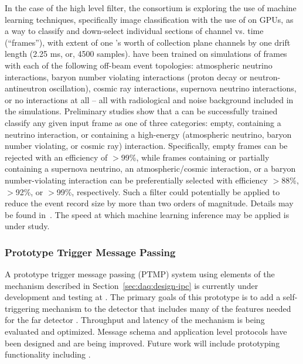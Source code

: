 In the case of the high level filter, the consortium is exploring the
use of machine learning techniques, specifically image classification
with the use of  on GPUs, as a way to
classify and down-select individual sections of  channel vs. time
(``frames''), with extent of one 's worth of collection plane
channels by one drift length (2.25 ms, or, 4500 samples).  have
been trained on  simulations of frames with each of
the following off-beam event topologies: 
atmospheric neutrino interactions, baryon number violating
interactions (proton decay or neutron-antineutron oscillation), cosmic
ray interactions, supernova neutrino interactions, or no interactions at all -- all
with radiological and noise background included in the
simulations. Preliminary studies show that a  can be successfully trained classify any
given input frame as one of three categories: empty, containing a  neutrino
interaction, or containing a high-energy (atmospheric neutrino, baryon
number violating, or cosmic ray) interaction. Specifically, empty frames can be
rejected with an efficiency of $>$99\%, while frames containing or
partially containing 
a supernova neutrino, an atmospheric/cosmic interaction, or a baryon
number-violating interaction can be preferentially selected with efficiency
$>$88\%, $>$92\%, or $>$99\%, respectively. Such a 
filter could potentially be applied to reduce the event record size by
more than two orders of magnitude. Details may be found in~.
The speed at which machine learning inference may be applied is under study.


\subsubsection{Prototype Trigger Message Passing}

A prototype trigger message passing (PTMP) system using elements of the  mechanism described in Section~\ref{sec:daq:design-ipc} is currently under development and testing at .
The primary goals of this prototype is to add a self-triggering mechanism to the  detector that includes many of the features needed for the far detector .
Throughput and latency of the mechanism is being evaluated and optimized.
Message schema and application level protocols have been designed and are being improved.
Future work will include prototyping  functionality including .

